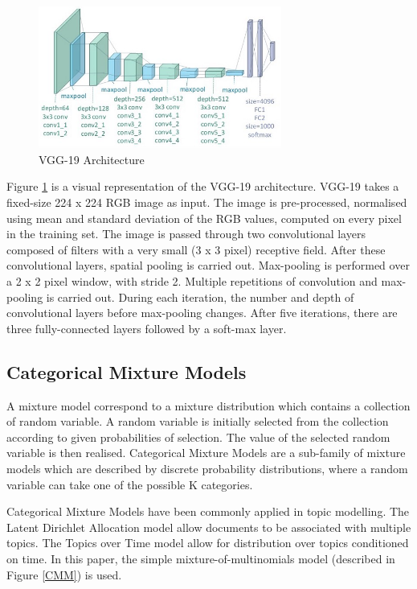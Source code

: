 \documentclass{article}
\begin{document}
\begin{figure}[h]
  \centering
  \includegraphics[width=8cm]{vgg19.png}
  \caption{VGG-19 Architecture \cite{vgg19img}}
  \label{vgg_architecture}
\end{figure}

Figure \ref{vgg_architecture} is a visual representation of the VGG-19 architecture. VGG-19 takes a fixed-size 224 x 224 RGB image as input. The image is pre-processed, normalised using mean and standard deviation of the RGB values, computed on every pixel in the training set. The image is passed through two convolutional layers composed of filters with a very small (3 x 3 pixel) receptive field. After these convolutional layers, spatial pooling is carried out. Max-pooling is performed over a 2 x 2 pixel window, with stride 2. Multiple repetitions of convolution and max-pooling is carried out. During each iteration, the number and depth of convolutional layers before max-pooling changes. After five iterations, there are three fully-connected layers followed by a soft-max layer. 

\subsection{Categorical Mixture Models}
A mixture model correspond to a mixture distribution which contains a collection of random variable. A random variable is initially selected from the collection according to given probabilities of selection. The value of the selected random variable is then realised. Categorical Mixture Models are a sub-family of mixture models which are described by discrete probability distributions, where a random variable can take one of the possible K categories.   

Categorical Mixture Models have been commonly applied in topic modelling. The Latent Dirichlet Allocation \cite{LDA} model  allow documents to be associated with multiple topics. The Topics over Time \cite{ToT} model allow for distribution over topics conditioned on time. In this paper, the simple mixture-of-multinomials model (described in Figure \ref{CMM}) is used.  
\end{document}
